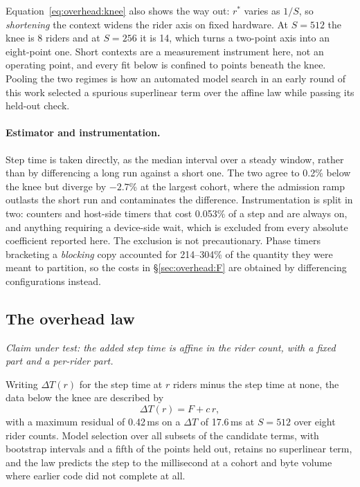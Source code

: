 Equation~\ref{eq:overhead:knee} also shows the way out: $r^{*}$ varies as $1/S$,
so \emph{shortening} the context widens the rider axis on fixed hardware. At
$S{=}512$ the knee is 8 riders and at $S{=}256$ it is 14, which turns a
two-point axis into an eight-point one.
Short contexts are a measurement instrument here, not an operating point, and
every fit below is confined to points beneath the knee. Pooling the two regimes
is how an automated model search in an early round of this work selected a
spurious superlinear term over the affine law while passing its held-out check.

\paragraph{Estimator and instrumentation.} Step time is taken directly, as the
median interval over a steady window, rather than by differencing a long run
against a short one. The two agree to 0.2\% below the knee but diverge by
$-2.7$\% at the largest cohort, where the admission ramp outlasts the short run
and contaminates the difference. Instrumentation is split in two: counters and
host-side timers that cost 0.053\% of a step and are always on, and anything
requiring a device-side wait, which is excluded from every absolute coefficient
reported here. The exclusion is not precautionary. Phase timers bracketing a
\emph{blocking} copy accounted for 214--304\% of the quantity they were meant to
partition, so the costs in \S\ref{sec:overhead:F} are obtained by differencing
configurations instead.

\subsection{The overhead law}
\label{sec:overhead:law}

\emph{Claim under test: the added step time is affine in the rider count, with a
fixed part and a per-rider part.}

Writing $\Delta T(r)$ for the step time at $r$ riders minus the step time at
none, the data below the knee are described by
\begin{equation}
\Delta T(r) = F + c\,r ,
\label{eq:overhead:law}
\end{equation}
with a maximum residual of 0.42\,ms on a $\Delta T$ of 17.6\,ms at $S{=}512$
over eight rider counts.
Model selection over all subsets of the candidate terms, with bootstrap
intervals and a fifth of the points held out, retains no superlinear term, and
the law predicts the step to the millisecond at a cohort and byte volume where
earlier code did not complete at all.

